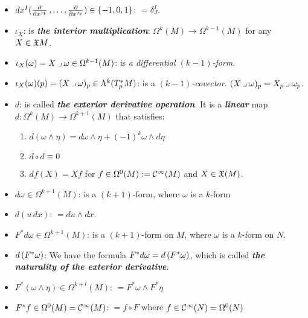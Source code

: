 \documentclass[11pt]{article}
\begin{document}
\begin{itemize}
\item $dx^{I}(\frac{\partial }{ \partial x^{j_1}} \,{,}\ldots{,}\, \frac{\partial }{ \partial x^{j_k}}) \in \left\{-1, 0, 1\right\}$: \quad $= \delta_{J}^{I}$.

\item $\iota_{X}$: \quad is \emph{\textbf{the interior multiplication}}: $\Omega^{k}(M) \rightarrow \Omega^{k-1}(M)$ for any $X \in {\mathfrak X}{M}$. 

\item $\iota_{X}(\omega) = X \mathbin{\lrcorner }{\omega} \in  \Omega^{k-1}(M)$: \quad is \emph{a differential $(k-1)$-form}.

\item $\iota_{X}(\omega)(p) = (X \mathbin{\lrcorner }{\omega})_p \in \Lambda^k(T_p^{*}M)$: \quad is a \emph{$(k-1)$-covector}. $(X \mathbin{\lrcorner }{\omega})_p = X_p \mathbin{\lrcorner }{\omega_p}$.

\item $d$: \quad is called \emph{\textbf{the exterior derivative operation}}. It is a \emph{\textbf{linear}} map $d: \Omega^{k}(M) \rightarrow \Omega^{k+1}(M) $ that satisfies:
\begin{enumerate}
\item $d (\omega \wedge \eta) = d\omega \wedge \eta + (-1)^{k}\omega \wedge d\eta$
\item $d \circ d \equiv 0$
\item $df(X) = Xf$ for $f \in \Omega^{0}(M) := {\mathcal C}^{\infty}(M)$ and $X \in {\mathfrak X}(M)$.
\end{enumerate}

\item $d\omega \in \Omega^{k+1}(M)$: \quad is a $(k+1)$-form, where $\omega$ is a $k$-form

\item $d(u\,dx)$: \quad $= du \wedge  dx$.

\item $F^{*}d\omega \in \Omega^{k+1}(M)$: \quad is a $(k+1)$-form on $M$, where $\omega$ is a $k$-form on $N$. 

\item $d\left(F^{*}\omega\right)$: \quad We have the formula $F^{*}d\omega = d\left(F^{*}\omega\right)$, which is called \emph{\textbf{the naturality of the exterior derivative}}.

\item $F^{*}(\omega \wedge \eta)  \in \Omega^{k+l}(M)$: \quad $= F^{*}\omega \wedge F^{*}\eta$

\item $F^{*}f \in \Omega^{0}(M) = {\mathcal C}^{\infty}(M)$: \quad $=f \circ F$ where $f \in {\mathcal C}^{\infty}(N) = \Omega^{0}(N)$


\end{itemize}
\end{document}

